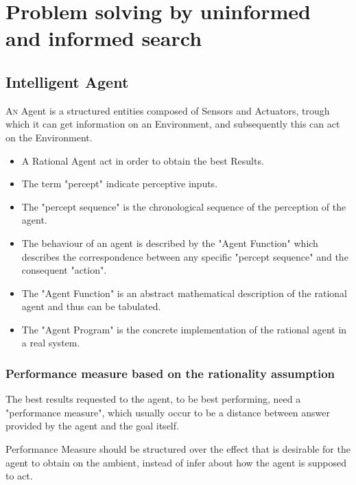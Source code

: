 \chapter{Problem solving by uninformed and informed search}\label{chap:1}



\section{Intelligent Agent}

\lettrine[lines=3,nindent=0em,loversize=0.5]{A}{n} Agent is a structured entities composed of Sensors and Actuators, trough which it can get information on an Environment, and subsequently this can act on the Environment.




\begin{itemize}
  \item A Rational Agent act in order to obtain the best Results.

  \item The term "percept" indicate perceptive inputs.

  \item The "percept sequence" is the chronological sequence of the perception of the agent.

  \item The behaviour of an agent is described by the "Agent Function" which describes the correspondence between any specific "percept sequence" and the consequent "action".

  \item The "Agent Function" is an abstract mathematical description of the rational agent and thus can be tabulated.

  \item The "Agent Program" is the concrete implementation of the rational agent in a real system.
\end{itemize}


\subsection{Performance measure based on the rationality assumption}
The best results requested to the agent, to be best performing, need a "performance measure", which usually occur to be a distance between answer provided by the agent and the goal itself.

Performance Measure should be structured over the effect that is desirable for the agent to obtain on the ambient, instead of infer about how the agent is supposed to act.

